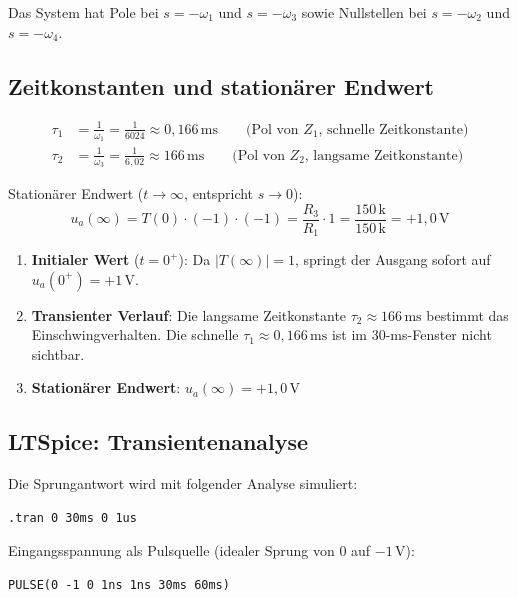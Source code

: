 \documentclass[12pt,a4paper]{article}
\begin{document}
Das System hat Pole bei $s = -\omega_1$ und $s = -\omega_3$ sowie
Nullstellen bei $s = -\omega_2$ und $s = -\omega_4$.

\subsection{Zeitkonstanten und stationärer Endwert}

\begin{align*}
  \tau_1 &= \frac{1}{\omega_1}
           = \frac{1}{6024}
           \approx 0{,}166\,\text{ms}
  \qquad \text{(Pol von } Z_1\text{, schnelle Zeitkonstante)} \\[4pt]
  \tau_2 &= \frac{1}{\omega_3}
           = \frac{1}{6{,}02}
           \approx 166\,\text{ms}
  \qquad \text{(Pol von } Z_2\text{, langsame Zeitkonstante)}
\end{align*}

Stationärer Endwert ($t \to \infty$, entspricht $s \to 0$):
\[
  u_a(\infty)
  = T(0) \cdot (-1) \cdot (-1)
  = \frac{R_3}{R_1} \cdot 1
  = \frac{150\,\text{k}}{150\,\text{k}}
  = +1{,}0\,\text{V}
\]

\begin{tcolorbox}[hinweis, title=Erwartetes Verhalten der Sprungantwort]
\begin{enumerate}
  \item \textbf{Initialer Wert} ($t = 0^+$): Da $|T(\infty)| = 1$, springt
        der Ausgang sofort auf $u_a(0^+) = +1\,\text{V}$.
  \item \textbf{Transienter Verlauf}: Die langsame Zeitkonstante
        $\tau_2 \approx 166\,\text{ms}$ bestimmt das Einschwingverhalten.
        Die schnelle $\tau_1 \approx 0{,}166\,\text{ms}$ ist im
        30-ms-Fenster nicht sichtbar.
  \item \textbf{Stationärer Endwert}: $u_a(\infty) = +1{,}0\,\text{V}$
\end{enumerate}
\end{tcolorbox}

\subsection{LTSpice: Transientenanalyse}

Die Sprungantwort wird mit folgender Analyse simuliert:

\begin{verbatim}
.tran 0 30ms 0 1us
\end{verbatim}

Eingangsspannung als Pulsquelle (idealer Sprung von $0$ auf $-1\,\text{V}$):
\begin{verbatim}
PULSE(0 -1 0 1ns 1ns 30ms 60ms)
\end{verbatim}
\end{document}
